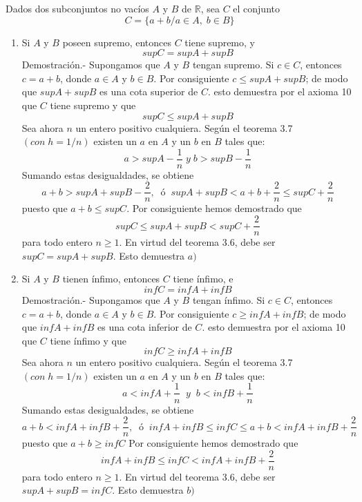 \begin{teo}
Dados dos subconjuntos no vacíos $A$ y $B$ de $\mathbb{R}$, sea $C$ el conjunto
$$C=\lbrace a+b / a\in A, \; b \in B   \rbrace$$
\begin{enumerate}[\bfseries a)]
\item Si $A$ y $B$ poseen supremo, entonces $C$ tiene supremo, y 
$$supC= supA + supB$$
Demostración.- \; Supongamos que $A$ y $B$ tengan supremo. Si $c \in C$, entonces $c=a+b$, donde $a\in A$ y $b\in B.$ Por consiguiente $c \leq supA +supB$; de modo que $supA + supB$ es una cota superior de $C$. esto demuestra por el axioma 10 que $C$ tiene supremo y que 
$$supC \leq supA + supB$$
Sea ahora $n$ un entero positivo cualquiera. Según el teorema 3.7 $\left( con \; h=1/n \right)$ existen un $a$ en $A$ y un $b$ en $B$ tales que:
$$a>supA - \displaystyle\frac{1}{n} \; y \; b>supB -\frac{1}{n}$$
Sumando estas desigualdades, se obtiene 
$$a+b>supA +supB -\displaystyle\frac{2}{n}, \; \; ó  \; \; supA + supB < a+b+\frac{2}{n} \leq supC +\frac{2}{n}$$
puesto que $a+b \leq supC.$ Por consiguiente hemos demostrado que
$$supC \leq supA + supB < supC + \displaystyle\frac{2}{n}$$
para todo entero $n \geq 1.$ En virtud del teorema 3.6, debe ser $supC = supA+supB.$ Esto demuestra $a)$\\
\item Si $A$ y $B$ tienen ínfimo, entonces $C$ tiene ínfimo, e
$$infC = infA+ infB$$ 
Demostración.- \; Supongamos que $A$ y $B$ tengan ínfimo. Si $c \in C$, entonces $c=a+b$, donde $a\in A$ y $b\in B.$ Por consiguiente $c \geq infA +infB$; de modo que $infA + infB$ es una cota inferior de $C$. esto demuestra por el axioma 10 que $C$ tiene ínfimo y que 
$$infC \geq infA + infB$$
Sea ahora $n$ un entero positivo cualquiera. Según el teorema 3.7 $\left( con \; h=1/n \right)$ existen un $a$ en $A$ y un $b$ en $B$ tales que:
$$a<infA + \displaystyle\frac{1}{n} \;\;  y \; \; b<infB + \frac{1}{n}$$
Sumando estas desigualdades, se obtiene 
$$a+b<infA +infB +\displaystyle\frac{2}{n}, \; \; ó \; \;  infA+infB \leq infC \leq a+b < infA+infB + \displaystyle\frac{2}{n} $$
puesto que $a+b \geq infC$ Por consiguiente hemos demostrado que
$$infA+ infB \leq infC <infA + infB + \displaystyle\frac{2}{n}$$
para todo entero $n \geq 1.$ En virtud del teorema 3.6, debe ser $supA+supB = infC.$ Esto demuestra $b)$\\\\
\end{enumerate}
\end{teo}

